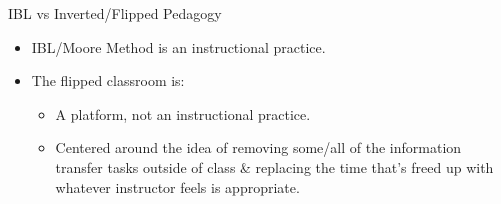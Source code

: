 \documentclass[10pt,handout]{beamer}
\begin{document}

\begin{frame}

\begin{block}{IBL vs Inverted/Flipped Pedagogy}
\begin{itemize}
\item IBL/Moore Method is an instructional practice.
\item The flipped classroom is:
    \begin{itemize}\normalsize
    \item A platform, not an instructional practice. 
    \item Centered around the idea of removing some/all of the information transfer tasks outside of class & replacing the time that’s freed up with whatever instructor feels is appropriate.
    \end{itemize}
\end{itemize}
\end{block}

\end{frame}

\end{document}
